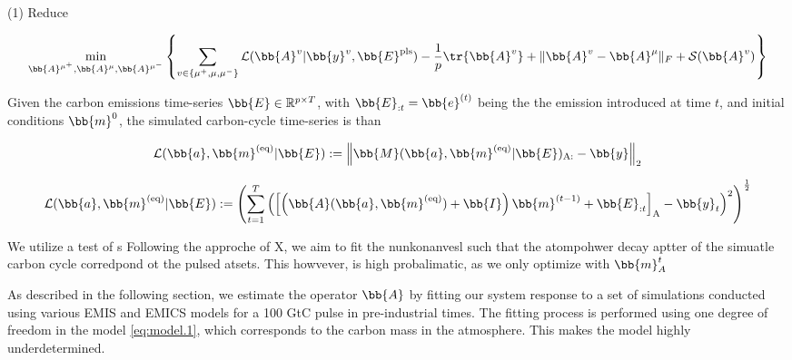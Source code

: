 (1) Reduce 




\begin{align}
	\underset{  \bb{A}^{\mu^+},\bb{A}^{\mu},\bb{A}^{\mu^-}}{\text{min}} \left\{ \sum_{ v \in \{\mu^+,\mu,\mu^-\} }    \mathcal{L}(\bb{A}^v|\bb{y}^{v},\bb{E}^{\text{pls}})  - \frac{1}{p} \tr{\bb{A}^{v}} + \| \bb{A}^{v} - \bb{A}^{\mu}  \|_{F}  + \mathcal{S}(\bb{A}^{v})^{} \right \}
\end{align}

















\newpage
Given the carbon emissions time-series $\bb{E} \in \mathbb{R}^{p \times T}$, with $\bb{E}_{:t}=\bb{e}^{(t)}$ being the the emission introduced at time $t$, and initial conditions $\bb{m}^{0}$, the simulated carbon-cycle time-series is than 
%




\begin{align}
	\mathcal{L}(\bb{a},\bb{m}^{(\text{eq})}|\bb{E}) :=  \left\|    \bb{M}(\bb{a},\bb{m}^{(\text{eq})}|\bb{E}) _{\text{A}:}   - \bb{y}    \right\|_2
\end{align}


\begin{align}
	\mathcal{L}(\bb{a},\bb{m}^{(\text{eq})}|\bb{E}) :=  \left ( \sum_{t=1}^{T}  \left( \left[  \left( \bb{A}(\bb{a},\bb{m}^{(\text{eq})} )+\bb{I} \right) \bb{m}^{(t-1)} + \bb{E}_{:t} \right]_{\text{A}}  - \bb{y}_{t} \right)^{2} \right)^{\frac{1}{2}}
\end{align}








\newpage

We utilize a test of s
Following the approche of X, we aim to fit the nunkonanvesl such that the atompohwer decay aptter of the simuatle carbon cycle corredpond ot the pulsed atsets. 
This howvever, is high probalimatic, as we only optimize with  $\bb{m}^{t}_{A}$

As described in the following section, we estimate the operator $\bb{A}$ by fitting our system response to a set of simulations conducted using various EMIS and EMICS models for a 100 GtC pulse in pre-industrial times. The fitting process is performed using one degree of freedom in the model \eqref{eq:model.1}, which corresponds to the carbon mass in the atmosphere. This makes the model highly underdetermined. 










